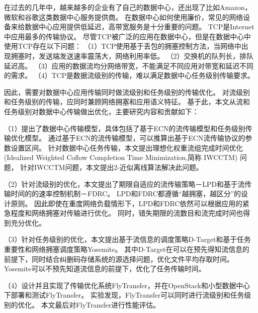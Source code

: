 \begin{cabstract}
在过去的几年中，越来越多的企业有了自己的数据中心，还出现了比如Amazon，微软和谷歌这类数据中心服务提供商。
在数据中心如何使用廉价，常见的网络设备来给数据中心应用提供低延迟，高带宽服务是十分重要的问题。
TCP是Internet中应用最多的传输协议。
尽管TCP被广泛的应用在数据中心，但是在数据中心中使用TCP存在以下问题：
（1）TCP使用基于丢包的拥塞控制方法，当网络中出现拥塞时，发送端发送速率震荡大，网络利用率低。
（2）交换机的队列长，排队延迟高。
（3）应用的数据流均分网络带宽，不能满足不同应用对带宽和延迟不同的需求。
（4）TCP是数据流级别的传输，难以满足数据中心任务级别传输要求。

因此，需要对数据中心应用传输同时做流级别和任务级别的传输优化。
对流级别和任务级别的传输，应同时兼顾网络拥塞和应用语义特征。
基于此，本文从流和任务级别对数据中心传输做出优化，主要研究内容和贡献如下：


（1）提出了数据中心传输模型，具体包括了基于ECN的流传输模型和任务级别传输优化模型。
通过基于ECN的流传输模型，可以推算出基于ECN流传输协议的参数设置区间。
针对数据中心任务传输，本文提出理想化权重流组完成时间优化 (Idealized Weighted Coflow Completion Time Minimization,简称 IWCCTM) 问题，
针对IWCCTM问题，本文提出2-近似离线算法解决此问题。


（2）针对流级别的优化，本文提出了期限自适应的流传输策略－LPD和基于流传输时间的的速率控制机制－FDRC。
LPD和FDRC都遵循“越拥塞，越区分”的设计原则。
因此即使在重度网络负载情形下，LPD和FDRC依然可以根据应用的紧急程度和网络拥塞对传输进行优化。
同时，错失期限的流数目和流完成时间也得到充分优化。
    
（3）针对任务级别的优化，本文提出基于流信息的调度策略D-Target和基于任务重要性和网络拥塞调度策略Yosemite。
其中D-Target在可以在预先得知流信息的前提下，同时结合纠删码存储系统的源选择问题，优化文件平均存取时间。
Yosemite可以不预先知道流信息的前提下，优化了任务传输时间。

（4）设计并且实现了传输优化系统FlyTransfer，并在OpenStack和小型数据中心下部署和测试FlyTransfer。
实验发现，FlyTransfer可以同时进行流级别和任务级别的优化。
本文最后对FlyTransfer进行性能评估。
  
\end{cabstract}

